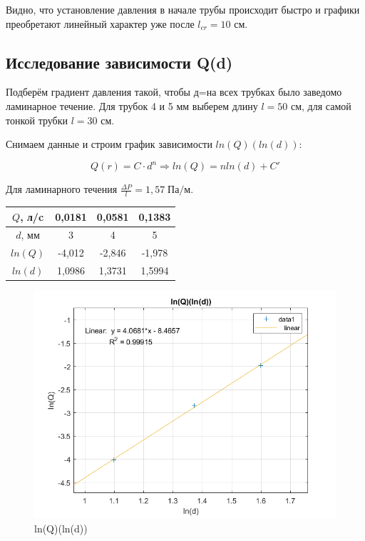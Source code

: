 \documentclass[a4paper, 12pt]{article} %
\begin{document}
Видно, что установление давления в начале трубы происходит быстро и графики преобретают линейный характер уже после $l_{cr} = 10$ см.

\subsection{Исследование зависимости Q(d)}

Подберём градиент давления такой, чтобы д=на всех трубках было заведомо ламинарное течение. Для трубок 4 и 5 мм выберем длину $l = 50$ см, для самой тонкой трубки $l = 30$ см.

Снимаем данные и строим график зависимости $ln(Q)(ln(d))$:

\begin{equation}
    Q(r) = C \cdot d^n \Rightarrow ln(Q) = nln(d) + C'
\end{equation}

Для ламинарного течения $\frac{\Delta P}{l}  = 1,57 \; \text{Па/м}$.

\begin{center}
\begin{tabular}{|c|c|c|c|}
\hline
    $Q$, л/c & 0,0181  & 0,0581  & 0,1383  \\ \hline
    $d$, мм  & 3      & 4      & 5      \\ \hline
    $ln(Q)$  & -4,012 & -2,846 & -1,978 \\ \hline
    $ln(d)$  & 1,0986 & 1,3731 & 1,5994 \\ \hline
\end{tabular}
\end{center}

\begin{figure}[!h]
    \centering
    \includegraphics[width = 12 cm]{qr}
    \caption{ln(Q)(ln(d))}
    \label{fig:vac}
\end{figure}
\end{document}
